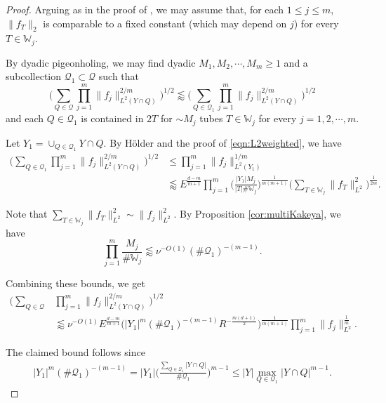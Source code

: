 \documentclass[11pt]{amsart}
\theoremstyle{definition}
\theoremstyle{remark}
\numberwithin{equation}{section}
\newcommand{\W}{\mathbb{W}}
\newcommand{\less}{\lessapprox}
\begin{document}
\begin{proof}
	Arguing as in the proof of  ,  we may assume that, for each $1\leq j\leq m$, $\| f_T \|_2$ is comparable to a fixed constant (which may depend on $j$) for every $T\in \W_j$. 
	
	By dyadic pigeonholing, we may find dyadic  $M_1,M_2,\cdots,M_m\geq 1$ and a subcollection $\mathcal{Q}_1 \subset \mathcal{Q}$ such that
	\[	\Big(\sum_{Q \in \mathcal{Q}}
	\prod_{j=1}^m \| f_j\|_{L^2(Y\cap Q)}^{2/m} \Big)^{1/2} \less \Big(\sum_{Q \in \mathcal{Q}_1}
	\prod_{j=1}^m\| f_j\|_{L^2(Y\cap Q)}^{2/m} \Big)^{1/2}  \]
	and  each $Q\in \mathcal{Q}_1$ is contained in $2T$ for $\sim M_j$ tubes $T\in \W_j$ for every $j=1,2,\cdots, m$. 
	
	Let $Y_1 = \cup_{Q\in \mathcal{Q}_1} Y\cap Q$. By H\"{o}lder and the proof of \eqref{eqn:L2weighted}, we have 
	\begin{align*}
		\Big(\sum_{Q \in \mathcal{Q}_1}
		\prod_{j=1}^m \| f_j\|_{L^2(Y\cap Q)}^{2/m} \Big)^{1/2}   &\leq	\prod_{j=1}^m \| f_j\|_{L^2(Y_1)}^{1/m}\\
		&\less E^{\frac{d-m}{m+1}} \prod_{j=1}^m  \Big(\frac{|Y_1|M_j}{|T|\# \W_j}\Big)^{\frac{1}{m(m+1)}}  \Big( \sum_{T\in \W_j} \| f_T \|_{L^2}^2 \Big)^{\frac{1}{2m}}.
	\end{align*}
	
	Note that $ \sum_{T\in \W_j} \| f_T \|_{L^2}^2  \sim \| f_j \|_{L^2}^2$.
	By Proposition \ref{cor:multiKakeya}, we have
	\[ 
	\prod_{j=1}^m  \frac{M_j}{\# \W_j}  \less \nu^{-O(1)}   (\# \mathcal{Q}_1)^{-(m-1)}. \]
	
	
	Combining these bounds, we get 
	\begin{align*}
		\Big(\sum_{Q \in \mathcal{Q}}
		&\prod_{j=1}^m \| f_j\|_{L^2(Y\cap Q)}^{2/m} \Big)^{1/2}
		\\ &\less \nu^{-O(1)}  E^{\frac{d-m}{m+1}} \Big( |Y_1|^m 
		(\# \mathcal{Q}_1)^{-(m-1)}  R^{-\frac{m(d+1)}{2}} \Big)^{\frac{1}{m(m+1)}} \prod_{j=1}^m  \| f_j \|_{L^2}^{\frac{1}{m}}.
	\end{align*}
	
	The claimed bound follows since 
	\begin{align*}
	|Y_1|^m 
	(\# \mathcal{Q}_1)^{-(m-1)}  
		=	 |Y_1|
		\Big(\frac{\sum_{Q\in \mathcal{Q}_1}  |Y\cap Q| }{\# \mathcal{Q}_1}\Big)^{m-1} \leq |Y|    \max_{Q\in \mathcal{Q}_1}  |Y\cap Q|^{m-1}. 
	\end{align*}
\end{proof}
\end{document}
